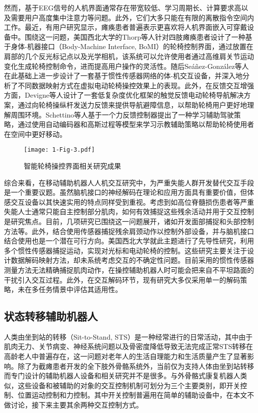 然而，基于EEG信号的人机界面通常存在带宽较低、学习周期长、计算要求高以及需要用户高度集中注意力等问题。此外，它们大多只能在有限的离散指令空间内工作。最近，有用户研究显示，瘫痪患者普遍表示更喜欢将人机界面嵌入可穿戴设备中\cite{zhangUnderstandingInteractionsSmart2022}。围绕这一问题，美国西北大学的Thorp等人\cite{thorpUpperBodyBasedPower2016d}针对四肢瘫痪患者设计了一种基于身体-机器接口（Body-Machine Interface, BoMI）的轮椅控制界面，通过放置在肩部的几个反光标记点以及光学相机，该系统可以允许使用者通过高维肩关节运动变化生成轮椅控制命令，进而提高用户操作的灵活性。随后Seáñez-González等人\cite{seanez-gonzalezStaticDynamicDecoding2017}在此基础上进一步设计了一套基于惯性传感器网络的体-机交互设备，并深入地分析了不同数据映射方式在虚拟电动轮椅操控效果上的表现。此外，在反馈交互增强方面，Devigne等人\cite{devigneDesignHapticGuidance2018}设计了一套低复杂度优化框架的触觉反馈电动轮椅导航解决方案，通过向轮椅操纵杆发送力反馈来提供导航避障信息，以帮助轮椅用户更好地理解周围环境。Schettino等人\cite{schettinoImprovingGeneralisationLearning2020}基于一个力反馈控制器提出了一种学习辅助驾驶策略，通过使用自动编码器和高斯过程等模型来学习示教辅助策略以帮助轮椅使用者在空间中更好移动。

\begin{figure}[h]
  \centering
  \texttt{[image: 1-Fig-3.pdf]}
  \caption{智能轮椅操控界面相关研究成果}
  \label{fig:1-3}
\end{figure}

综合来看，在移动辅助机器人人机交互研究中，为严重失能人群开发替代交互手段是一个重要议题。虽然脑机接口的神经解码在理论和应用方面具有重要价值，但体感交互设备以其快速实用的特点同样受到重视。考虑到如高位脊髓损伤患者等严重失能人士通常只能自主控制部分肌肉，如何有效捕捉这些残余活动并用于交互控制是研究焦点。目前，几项研究已围绕这一问题展开，诸如开发面部捕捉和头部控制方法等。此外，结合使用传感器捕捉残余肩颈动作以控制外部设备，并与脑机接口结合使用也是一个潜在可行方向。美国西北大学就此主题进行了先导性研究，利用多个惯性传感器捕捉运动，实现对光标和电动轮椅的控制。这些研究主要关注于设计数据解码映射方法，却未系统考虑交互的不确定性问题。目前采用的惯性传感器测量方法无法精确捕捉肌肉动作，在操控辅助机器人时可能会把来自不平坦路面的干扰引入交互过程。此外，在交互解码环节，现有研究大多仅采用单一的解码策略，未在多任务情景中评估其适用性。

\subsection{状态转移辅助机器人}
人类由坐到站的转移（Sit-to-Stand, STS）是一种经常进行的日常活动，其中由于肌肉无力、关节病变、神经系统问题以及骨密度降低导致无法完成正常STS转移在高龄老人中普遍存在，这一问题对老年人的生活自理能力和生活质量产生了显著影响。除了为截瘫患者开发的全下肢外骨骼系统外，当前仅为支持人体由坐到站转移而专门设计的辅助机器人设备和相关研究并不是很多。与外骨骼式康复机器人类似，这些设备和被辅助的对象的交互控制机制可划分为三个主要类别，即开关控制、位置运动控制和力控制。其中开关控制普遍用在简单的辅助设备中，在本文不做讨论，接下来主要其余两种交互控制方式。

